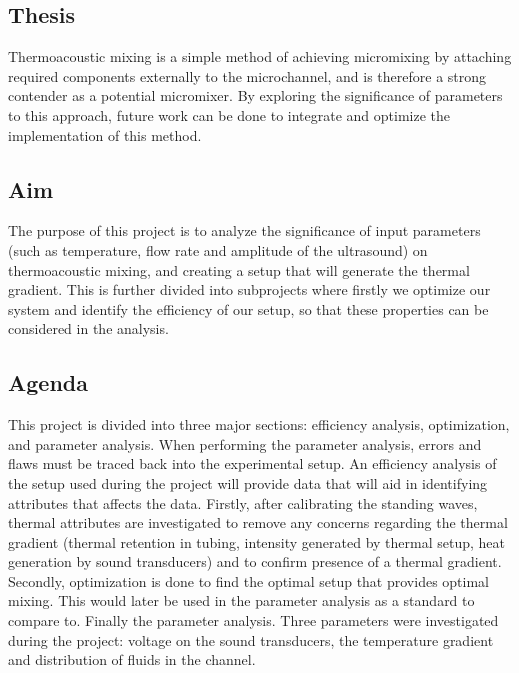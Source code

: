 \documentclass[twoside,twocolumn,9pt,a4paper]{IEEEtran}
\begin{document}
\subsection{Thesis}

Thermoacoustic mixing is a simple method of achieving micromixing by attaching required components externally to the microchannel, and is therefore a strong contender as a potential micromixer. By exploring the significance of parameters to this approach, future work can be done to integrate and optimize the implementation of this method.

\subsection{Aim}

The purpose of this project is to analyze the significance of input parameters (such as temperature, flow rate and amplitude of the ultrasound) on thermoacoustic mixing, and creating a setup that will generate the thermal gradient. This is further divided into subprojects where firstly we optimize our system and identify the efficiency of our setup, so that these properties can be considered in the analysis.

\subsection{Agenda}

This project is divided into three major sections: efficiency analysis, optimization, and parameter analysis. When performing the parameter analysis, errors and flaws must be traced back into the experimental setup. An efficiency analysis of the setup used during the project will provide data that will aid in identifying attributes that affects the data. Firstly, after calibrating the standing waves, thermal attributes are investigated to remove any concerns regarding the thermal gradient (thermal retention in tubing, intensity generated by thermal setup, heat generation by sound transducers) and to confirm presence of a thermal gradient. Secondly, optimization is done to find the optimal setup that provides optimal mixing. This would later be used in the parameter analysis as a standard to compare to. Finally the parameter analysis. Three parameters were investigated during the project: voltage on the sound transducers, the temperature gradient and distribution of fluids in the channel.

\end{document}
